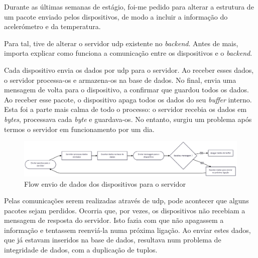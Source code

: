 

Durante as últimas semanas de estágio, foi-me pedido para alterar a estrutura de um pacote enviado pelos dispositivos, de modo a incluir a informação do acelerómetro e da temperatura.

Para tal, tive de alterar o servidor \acs{udp} existente no \textit{backend}. Antes de mais, importa explicar como funciona a comunicação entre os dispositivos e o \textit{backend}.

Cada dispositivo envia os dados por \acs{udp} para o servidor. Ao receber esses dados, o servidor processa-os e armazena-os na base de dados. No final, envia uma mensagem de volta para o dispositivo, a confirmar que guardou todos os dados. Ao receber esse pacote, o dispositivo apaga todos os dados do seu \textit{buffer} interno. Esta foi a parte mais calma de todo o processo: o servidor recebia os dados em \textit{bytes}, processava cada \textit{byte} e guardava-os. No entanto, surgiu um problema após termos o servidor em funcionamento por um dia.

\begin{figure}[!h]
	\centering
	\includegraphics[width=\textwidth]{figs/flowEnvioDados.png}
	\caption{Flow envio de dados dos dispositivos para o servidor}
	\label{fig:flowDevicesServer}
\end{figure}

Pelas comunicações serem realizadas através de \acs{udp}, pode acontecer que alguns pacotes sejam perdidos. Ocorria que, por vezes, os dispositivos não recebiam a mensagem de resposta do servidor. Isto fazia com que não apagassem a informação e tentassem reenviá-la numa próxima ligação. Ao enviar estes dados, que já estavam inseridos na base de dados, resultava num problema de integridade de dados, com a duplicação de tuplos.

